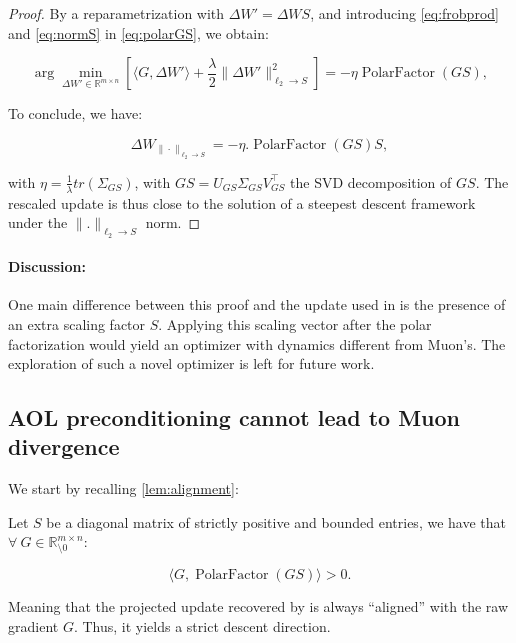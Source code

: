 \begin{proof}
    By a reparametrization with $\Delta W' = \Delta W S$, and introducing \cref{eq:frobprod} and \cref{eq:normS} in \cref{eq:polarGS}, we obtain:
    
    \begin{equation}
        \arg \min_{\Delta W' \in \mathbb{R}^{m \times n}} \left[ \langle G, \Delta W' \rangle + \frac{\lambda}{2} \| \Delta W' \|_{\ell_2 \rightarrow S}^2 \right] = 
        - \eta \operatorname{PolarFactor}(G S),
    \end{equation}
    
    To conclude, we have:
    
    \begin{equation}
        \Delta W_{\| \cdot \|_{\ell_2 \rightarrow S}} = - \eta . \operatorname{PolarFactor}(G S)S,
    \end{equation}
    
    \noindent with $\eta = \frac{1}{\lambda} tr (\Sigma_{GS})$, with $GS=U_{GS} \Sigma_{GS} V_{GS}^\top$ the SVD decomposition of $GS$.
    \fi 
    The rescaled \turbomuon update is thus close to the solution of a steepest descent framework under the  $\| . \|_{\ell_2 \rightarrow S}$ norm.
    
    \end{proof}

    \paragraph{Discussion:} One main difference between this proof and the update used in \turbomuon is the presence of an extra scaling factor $S$. Applying this scaling vector after the polar factorization would yield an optimizer with dynamics different from Muon's. The exploration of such a novel optimizer is left for future work. 
    
    \subsection{AOL preconditioning cannot lead to Muon divergence}
    \label{supp:descent_proof}
    
        We start by recalling \cref{lem:alignment}:
        

        \begin{lemma*}[Lemma 1]
        \label{lem:alignment2}
            Let $S$ be a diagonal matrix of strictly positive and bounded entries, we have that $\forall \ G \in \mathbb{R}^{m \times n}_{\setminus 0}$:
        
            \begin{equation}
                \langle G, \operatorname{PolarFactor}(GS) \rangle > 0.
            \end{equation}
        
            \noindent Meaning that the projected update recovered by \turbomuon is always ``aligned'' with the raw gradient $G$. Thus, it yields a strict descent direction.
        \end{lemma*}
        
